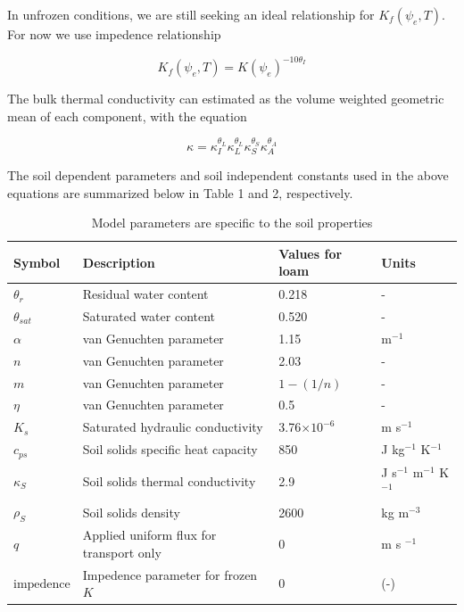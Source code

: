 \documentclass[10pt,a4paper]{article}
\begin{document}
In unfrozen conditions, we are still seeking an ideal relationship for $K_f(\psi_e,T)$. For now we use impedence relationship

\begin{equation}
K_f(\psi_e,T)=K(\psi_e)^{-10\theta_I}
\end{equation}

The bulk thermal conductivity can estimated as the volume weighted geometric mean of each component, with the equation

\begin{equation}
\kappa=
\kappa_I^{\theta_L}
\kappa_L^{\theta_L}
\kappa_S^{\theta_S}
\kappa_A^{\theta_A}
\end{equation}

The soil dependent parameters and soil independent constants used in the above equations are summarized below in Table 1 and 2, respectively. 
\newpage
\begin{table}[h]
	\begin{center}
		\begin{tabular}{|p{1.8cm}|p{6cm}|p{3cm}|p{3cm}|}
\hline
Symbol & Description & Values for loam & Units
\\ \hline
$\theta_r$ & Residual water content & 0.218 & - \\
$\theta_{sat}$ & Saturated water content & 0.520 & - \\
$\alpha$ & van Genuchten parameter & 1.15 & m$^{-1}$ \\
$n$ & van Genuchten parameter & 2.03 & - \\
$m$ & van Genuchten parameter & $1-(1/n)$ & - \\ 
$\eta$ & van Genuchten parameter & 0.5 & - \\
$K_s$ & Saturated hydraulic conductivity & 3.76$\times 10^{-6}$ & m s$^{-1}$ \\
$c_{ps}$ & Soil solids specific heat capacity &  850 & J kg$^{-1}$ K$^{-1}$ \\
$\kappa_S$ & Soil solids thermal conductivity & 2.9 & J s$^{-1}$ m$^{-1}$ K$^{-1}$ \\
$\rho_S$ & Soil solids density & 2600 & kg m$^{-3}$ \\
$q$ & Applied uniform flux for transport only & 0 & m s $^{-1}$ \\
$\text{impedence}$ & Impedence parameter for frozen $K$ & 0 & (-) \\
\hline
		\end{tabular}
\caption{Model parameters are specific to the soil properties}
	\end{center}
\end{table}
\end{document}
